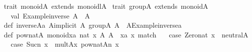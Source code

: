 \begin{isabellebody}
\begin{isamarkuptext}
\isanewline
trait\ monoid{}A{}\ extends\ monoidl{}A{}\ {}\isanewline
{}\isanewline
\isanewline
trait\ group{}A{}\ extends\ monoid{}A{}\ {}\isanewline
\ \ val\ {}Example{}inverse{}{}\ A\ {}{}\ A\isanewline
{}\isanewline
def\ inverse{}A{}{}a{}\ A{}{}implicit\ A{}\ group{}A{}{}{}\ A\ {}\ A{}{}Example{}inverse{}{}a{}\isanewline
\isanewline
def\ pow{}nat{}A{}\ monoid{}{}xa{}{}\ nat{}\ x{}\ A{}{}\ A\ {}\ {}xa{}{}\ x{}\ match\ {}\isanewline
\ \ case\ {}Zero{}nat{}\ x{}\ {}{}\ neutral{}A{}\isanewline
\ \ case\ {}Suc{}n{}{}\ x{}\ {}{}\ mult{}A{}{}x{}\ pow{}nat{}A{}{}n{}\ x{}{}\isanewline

\end{isamarkuptext}
\end{isabellebody}
